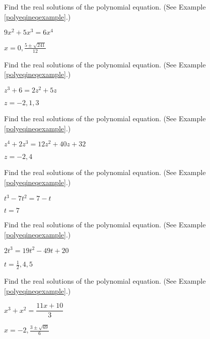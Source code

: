 \documentclass{ximera}
\begin{document}
\begin{problem}
Find the real solutions of the polynomial equation.  (See Example \ref{polyeqineqexample}.)

$9x^{2}+5x^{3}= 6x^{4}$ 

\begin{solution}
$x = 0, \frac{5 \pm \sqrt{241}}{12}$
\end{solution}
\end{problem} 

\begin{problem}
Find the real solutions of the polynomial equation.  (See Example \ref{polyeqineqexample}.)

$z^{3} + 6 = 2z^{2} + 5z$ 

\begin{solution}
$z = -2,1,3$
\end{solution}

\end{problem} 

\begin{problem}
Find the real solutions of the polynomial equation.  (See Example \ref{polyeqineqexample}.)

$z^{4} + 2z^{3} = 12z^{2} + 40z + 32$ 

\begin{solution}
$z=-2,4$
\end{solution}

\end{problem} 

\begin{problem}
Find the real solutions of the polynomial equation.  (See Example \ref{polyeqineqexample}.)

$t^{3} - 7t^{2} = 7-t$

\begin{solution}
$t=7$
\end{solution}
\end{problem} 

\begin{problem}
Find the real solutions of the polynomial equation.  (See Example \ref{polyeqineqexample}.)

$2t^{3} = 19t^{2} - 49t + 20$ 

\begin{solution}
$t = \frac{1}{2}, 4, 5$
\end{solution}

\end{problem}  

\begin{problem}
Find the real solutions of the polynomial equation.  (See Example \ref{polyeqineqexample}.)

$x^{3} + x^{2} = \dfrac{11x + 10}{3}$ 

\begin{solution}
$x = -2, \frac{3 \pm \sqrt{69}}{6}$
\end{solution}

\end{problem} 
\end{document}
